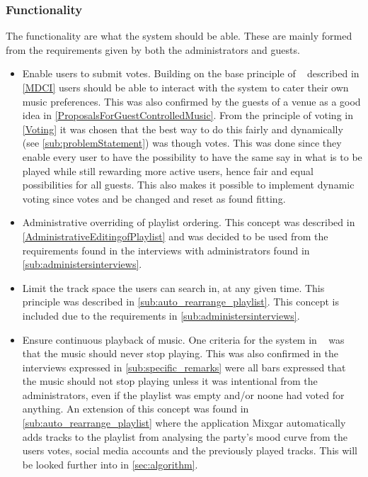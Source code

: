 \subsubsection{Functionality}
\label{subsub:functionality}
The functionality are what the system should be able. These are mainly formed from the requirements given by both the administrators and guests.
\begin{itemize}
    \item Enable users to submit votes. Building on the base principle of ~\cite{sorensen2012} described in \cref{MDCI} users should be able to interact with the system to cater their own music preferences. This was also confirmed by the guests of a venue as a good idea in \cref{ProposalsForGuestControlledMusic}. From the principle of voting in \cref{Voting} it was chosen that the best way to do this fairly and dynamically (see \cref{sub:problemStatement}) was though votes. This was done since they enable every user to have the possibility to have the same say in what is to be played while still rewarding more active users, hence fair and equal possibilities for all guests. This also makes it possible to implement dynamic voting since votes and be changed and reset as found fitting.
    \item Administrative overriding of playlist ordering. This concept was described in \cref{AdministrativeEditingofPlaylist} and was decided to be used from the requirements found in the interviews with administrators found in \cref{sub:administersinterviews}.
    \item Limit the track space the users can search in, at any given time. This principle was described in \cref{sub:auto_rearrange_playlist}. This concept is included due to the requirements in \cref{sub:administersinterviews}.
		\item Ensure continuous playback of music. One criteria for the system in ~\cite{sorensen2012} was that the music should never stop playing. This was also confirmed in the interviews expressed in \cref{sub:specific_remarks} were all bars expressed that the music should not stop playing unless it was intentional from the administrators, even if the playlist was empty and/or noone had voted for anything. An extension of this concept was found in \cref{sub:auto_rearrange_playlist} where the application Mixgar automatically adds tracks to the playlist from analysing the party’s mood curve from the users votes, social media accounts and the previously played tracks. This will be looked further into in \cref{sec:algorithm}.

\end{itemize}

